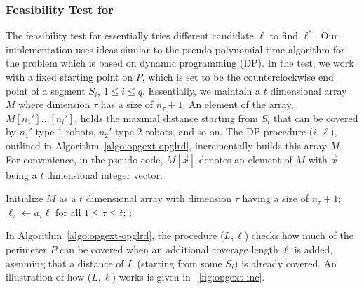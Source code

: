 \subsubsection{Feasibility Test for \opglrd} The feasibility test for \opglrd 
essentially tries different candidate $\ell$ to find $\ell^*$. Our implementation uses 
ideas similar to the pseudo-polynomial time algorithm for the \knapsack problem which
is based on dynamic programming (DP). In the test, we work with a fixed starting point on 
$P$, which is set to be the counterclockwise end point of a segment $S_i$, $1 \le i \le q$. 
Essentially, we maintain a $t$ dimensional array $M$ where dimension $\tau$
has a size of $n_{\tau} +1$. An element of the array, $M[n_1']\ldots[n_t']$, holds the 
maximal distance starting from $S_i$ that can be covered by $n_1'$ type 1 robots, 
$n_2'$ type 2 robots, and so on. The DP procedure \opglrfeasible($i, \ell$), outlined in 
Algorithm~\ref{algo:opgext-opglrd}, incrementally builds this array $M$. For convenience,
in the pseudo code, $M[\vec{x}]$ denotes an element of $M$ with $\vec{x}$ being 
a $t$ dimensional integer vector. 

\begin{algorithm}
	\DontPrintSemicolon
		Initialize $M$ as a $t$ dimensional array with dimension $\tau$ having a size of $n_{\tau} + 1$;\;
		$\ell_{\tau} \leftarrow a_{\tau}\ell$ for all $1\le \tau \le t$;\;
		;
	\caption{\opglrfeasible($i, \ell$)}\label{algo:opgext-opglrd}
\end{algorithm}

In Algorithm~\ref{algo:opgext-opglrd}, the procedure \inc($L, \ell$) checks how much of the 
perimeter $P$ can be covered when an additional coverage length $\ell$ is added, 
assuming that a distance of $L$ (starting from some $S_i$) is already covered. An 
illustration of how \inc($L, \ell$) works is given in ~\ref{fig:opgext-inc}.
 

